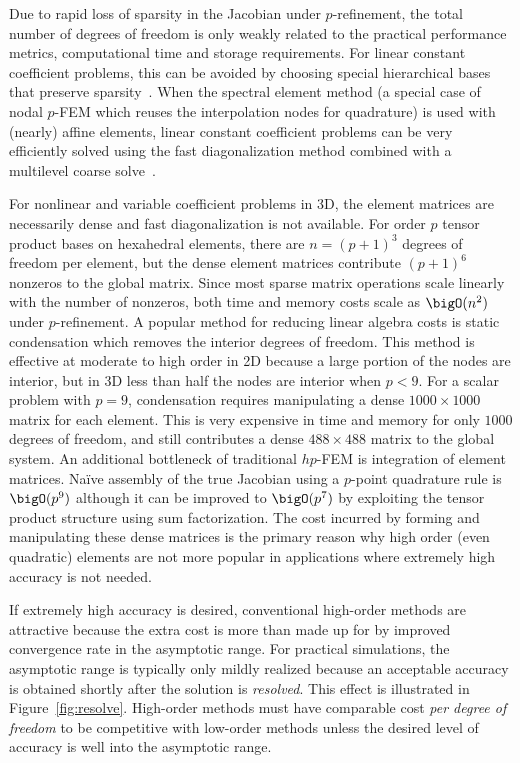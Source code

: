 Due to rapid loss of sparsity in the Jacobian under $p$-refinement, the total number of degrees of freedom is only
weakly related to the practical performance metrics, computational time and storage requirements.  For linear constant
coefficient problems, this can be avoided by choosing special hierarchical bases that preserve
sparsity~\cite{karniadakis2005she}.  When the spectral element method (a special case of nodal $p$-FEM which reuses the
interpolation nodes for quadrature) is used with (nearly) affine elements, linear constant coefficient problems can be
very efficiently solved using the fast diagonalization method combined with a multilevel coarse
solve~\cite{lottes2005hms}.

For nonlinear and variable coefficient problems in 3D, the element matrices are necessarily dense and fast
diagonalization is not available.  For order $p$ tensor product bases on hexahedral elements, there are $n = (p+1)^3$
degrees of freedom per element, but the dense element matrices contribute $(p+1)^6$ nonzeros to the global matrix.
Since most sparse matrix operations scale linearly with the number of nonzeros, both time and memory costs scale as
$\bigO(n^2)$ under $p$-refinement.  A popular method for reducing linear algebra costs is static condensation which
removes the interior degrees of freedom.  This method is effective at moderate to high order in 2D because a large
portion of the nodes are interior, but in 3D less than half the nodes are interior when $p<9$.  For a scalar problem
with $p=9$, condensation requires manipulating a dense $1000\times 1000$ matrix for each element.  This is very
expensive in time and memory for only $1000$ degrees of freedom, and still contributes a dense $488\times 488$ matrix to
the global system.  An additional bottleneck of traditional $hp$-FEM is integration of element matrices.  Na\"ive
assembly of the true Jacobian using a $p$-point quadrature rule is $\bigO(p^9)$ although it can be improved to
$\bigO(p^7)$ by exploiting the tensor product structure using sum factorization.  The cost incurred by forming and
manipulating these dense matrices is the primary reason why high order (even quadratic) elements are not more popular in
applications where extremely high accuracy is not needed.

If extremely high accuracy is desired, conventional high-order methods are attractive because the extra cost is more
than made up for by improved convergence rate in the asymptotic range.  For practical simulations, the asymptotic range
is typically only mildly realized because an acceptable accuracy is obtained shortly after the solution is
\emph{resolved}.  This effect is illustrated in Figure~\ref{fig:resolve}.  High-order methods must have comparable cost
\emph{per degree of freedom} to be competitive with low-order methods unless the desired level of accuracy is well into
the asymptotic range.

